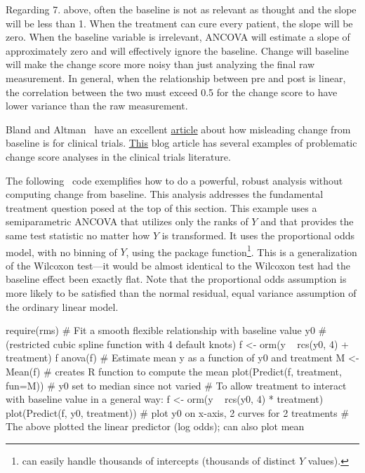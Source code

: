 Regarding 7. above, often the baseline is not as relevant as thought and the slope will be less than 1.  When the treatment can cure every patient, the slope will be zero.  When the baseline variable is irrelevant, ANCOVA will estimate a slope of approximately zero and will effectively ignore the baseline.  Change will baseline will make the change score more noisy than just analyzing the final raw measurement.  In general, when the relationship between pre and post is linear, the correlation between the two must exceed 0.5 for the change score to have lower variance than the raw measurement.

Bland and Altman~\cite{bla11com} have an excellent \href{https://www.ncbi.nlm.nih.gov/pmc/articles/PMC3286439}{article} about how misleading change from baseline is for clinical trials.  \href{http://www.fharrell.com/post/errmed#change}{This} blog article has several examples of problematic change score analyses in the clinical trials literature.

The following \R\ code exemplifies how to do a powerful, robust
analysis without computing change from baseline.  This analysis
addresses the fundamental treatment question posed at the top of this
section.  This example uses a semiparametric ANCOVA that utilizes only
the ranks of $Y$ and that provides the same test statistic no matter
how $Y$ is transformed.  It uses the proportional odds model, with no
binning of $Y$, using the  package 
function\footnote{ can easily handle thousands of intercepts
  (thousands of distinct $Y$ values).}.  This is a generalization of
the Wilcoxon test---it would be almost identical to the Wilcoxon test
had the baseline effect been exactly flat.  Note that the proportional
odds assumption is more likely to be satisfied than the normal
residual, equal variance assumption of the ordinary linear model. 

\begin{Schunk}
\begin{Sinput}
require(rms)
# Fit a smooth flexible relationship with baseline value y0
# (restricted cubic spline function with 4 default knots)
f <- orm(y ~ rcs(y0, 4) + treatment)
f
anova(f)
# Estimate mean y as a function of y0 and treatment
M <- Mean(f)   # creates R function to compute the mean
plot(Predict(f, treatment, fun=M))  # y0 set to median since not varied
# To allow treatment to interact with baseline value in a general way:
f <- orm(y ~ rcs(y0, 4) * treatment)
plot(Predict(f, y0, treatment))  # plot y0 on x-axis, 2 curves for 2 treatments
# The above plotted the linear predictor (log odds); can also plot mean
\end{Sinput}
\end{Schunk}

